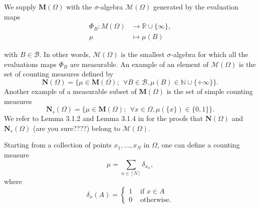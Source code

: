 \documentclass[twoside,11pt]{book}
\newtheorem{proposition}{Proposition}
\numberwithin{theorem}{chapter}
\numberwithin{definition}{chapter}
\numberwithin{proposition}{chapter}
\numberwithin{corollary}{chapter}
\numberwithin{example}{chapter}
\numberwithin{lemma}{chapter}
\begin{document}
We supply $\mathbf{M}(\Omega)$ with the $\sigma$-algebra $\mathcal{M}(\Omega)$ generated by the evaluation maps
\begin{align}
\Phi_{B}: M(\Omega) &\rightarrow \mathbb{R}\cup \{\infty \}, \nonumber\\
\mu & \mapsto \mu(B) \nonumber
\end{align}

with $B \in \mathcal{B}$. In other words, $\mathcal{M}(\Omega)$ is the smallest $\sigma$-algebra for which all the evaluations maps $\Phi_{B}$ are measurable. An example of an element of $\mathcal{M}(\Omega)$ is the set of counting measures defined by
\begin{equation}
\mathbf{N}(\Omega) = \bigg\{ \mu \in \mathbf{M}(\Omega); \:\: \forall B \in \mathcal{B}, \mu(B) \in \mathbb{N}\cup \{+\infty\} \bigg\}.
\end{equation}
Another example of a measurable subset of $\mathbf{M}(\Omega)$ is the set of simple counting measures 
\begin{equation}
\mathbf{N}_{s}(\Omega) = \bigg\{ \mu \in \mathbf{M}(\Omega); \:\: \forall x \in \Omega, \mu(\{x\}) \in \{0,1\} \bigg\}.
\end{equation}
We refer to Lemma 3.1.2 and Lemma 3.1.4 in \citep{ScWe08} for the proofs that $\mathbf{N}(\Omega)$ and $\mathbf{N}_{s}(\Omega)$ (are you sure????) belong to $\mathcal{M}(\Omega)$.

Starting from a collection of points $x_{1}, \dots, x_{N}$ in $\Omega$, one can define a counting measure
\begin{equation}
\mu = \sum\limits_{n \in [N]}\delta_{x_n},
\end{equation}
where
$$
\delta_{x}(A) = \left\{
    \begin{array}{ll}
     1 & \text{ if } x\in A\\
0 & \text{ otherwise}.
\end{array}
\right.
$$
\end{document}

